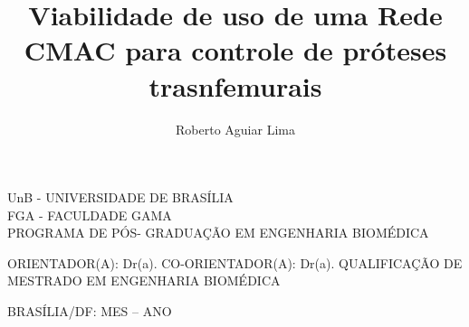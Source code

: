 \documentclass{book}
\title{Viabilidade de uso de uma Rede CMAC para controle de pr\'oteses trasnfemurais}
\author{Roberto Aguiar Lima}
\begin{document}
	\begin{center}
		UnB - UNIVERSIDADE DE BRAS\'ILIA\\
		FGA - FACULDADE GAMA\\
		PROGRAMA DE P\'OS- GRADUA\c{C}\~AO EM ENGENHARIA BIOM\'EDICA
	\end{center}
	\maketitle
	\begin{center}
		ORIENTADOR(A): Dr(a). 
		CO-ORIENTADOR(A): Dr(a).
		QUALIFICAÇÃO DE  MESTRADO EM ENGENHARIA BIOMÉDICA

		BRASÍLIA/DF: MES – ANO
	\end{center}
\end{document}
